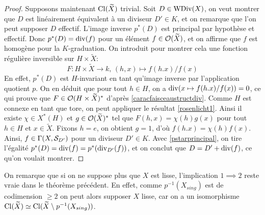 \begin{proof}
Supposons maintenant $\operatorname{Cl}(\widetilde{X})$ trivial. Soit $D\in\operatorname{WDiv}(X)$, on veut montrer que $D$ est linéairement équivalent à un diviseur $D'\in K$, et on remarque que l'on peut supposer $D$ effectif. L'image inverse $p^*(D)$ est principal par hypothèse et effectif. Donc $p^*(D)=\operatorname{div}(f)$ pour un élément $f\in \mathcal{O}(\widetilde{X})$, et on affirme que $f$ est homogène pour la $K$-graduation. On introduit pour montrer cela une fonction régulière inversible sur $H\times \widetilde{X}$:
$$F:H\times \widetilde{X}\rightarrow k,\,(h,x)\mapsto f(h.x)/f(x)$$
En effet, $p^*(D)$ est $H$-invariant en tant qu'image inverse par l'application quotient $p$. On en déduit que pour tout $h\in H$, on a $\operatorname{div}(x\mapsto f(h.x)/f(x))=0$, ce qui prouve que $F\in \mathcal{O}(H\times \widetilde{X})^*$ d'après \ref{caracfaisceaustructdiv}. Comme $H$ est connexe en tant que tore, on peut appliquer le résultat \ref{rosenlicht1}. Ainsi il existe $\chi \in X^*(H)$ et $g\in\mathcal{O}(\widetilde{X})^*$ tel que $F(h,x)=\chi(h)g(x)$ pour tout $h\in H$ et $x\in \widetilde{X}$. Fixons $h=e$, on obtient $g=1$, d'où $f(h.x)=\chi(h)f(x)$. Ainsi, $f\in \Gamma(X, \mathcal{S}_{D'})$ pour un diviseur $D'\in K$. Avec \ref{pstarprincipal}, on tire l'égalité $p^*(D)=\operatorname{div}(f)=p^*(\operatorname{div}_{D'}(f))$, et on conclut que $D=D'+\operatorname{div}(f)$, ce qu'on voulait montrer.

\end{proof}

\begin{rem}
On remarque que si on ne suppose plus que $X$ est lisse, l'implication $1\implies 2$ reste vraie dans le théorème précédent. En effet, comme $p^{-1}(X_{sing})$ est de codimension $\geq 2$ on peut alors supposer $X$ lisse, car on a un isomorphisme $\operatorname{Cl}(\widetilde{X})\simeq\operatorname{Cl}(\widetilde{X}\setminus p^{-1}(X_{sing}))$. 
\end{rem}


